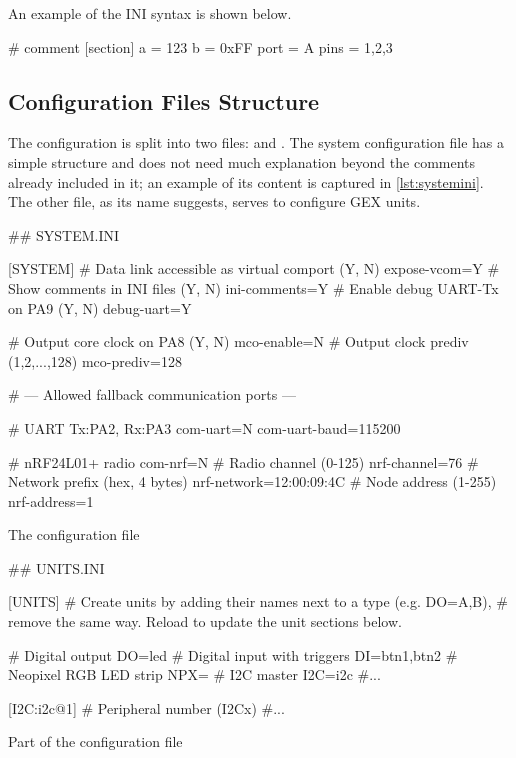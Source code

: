 \noindent
An example of the INI syntax is shown below.

\begin{inicode}
# comment
[section]
a = 123
b = 0xFF
port = A
pins = 1,2,3
\end{inicode}
	
\subsection{Configuration Files Structure}

The configuration is split into two files:  and . The system configuration file has a simple structure and does not need much explanation beyond the comments already included in it; an example of its content is captured in \cref{lst:systemini}. The other file, as its name suggests, serves to configure GEX units.

\begin{listing}
	\begin{inicode}
		## SYSTEM.INI
		
		[SYSTEM]
		# Data link accessible as virtual comport (Y, N)
		expose-vcom=Y
		# Show comments in INI files (Y, N)
		ini-comments=Y
		# Enable debug UART-Tx on PA9 (Y, N)
		debug-uart=Y
		
		# Output core clock on PA8 (Y, N)
		mco-enable=N
		# Output clock prediv (1,2,...,128)
		mco-prediv=128
		
		# --- Allowed fallback communication ports ---
		
		# UART Tx:PA2, Rx:PA3
		com-uart=N
		com-uart-baud=115200
		
		# nRF24L01+ radio
		com-nrf=N
		# Radio channel (0-125)
		nrf-channel=76
		# Network prefix (hex, 4 bytes)
		nrf-network=12:00:09:4C
		# Node address (1-255)
		nrf-address=1
	\end{inicode}
	\caption{\label{lst:systemini}The  configuration file}
\end{listing}

\begin{listing}
	\begin{inicode}
		## UNITS.INI
		
		[UNITS]
		# Create units by adding their names next to a type (e.g. DO=A,B),
		# remove the same way. Reload to update the unit sections below.
		
		# Digital output
		DO=led
		# Digital input with triggers
		DI=btn1,btn2
		# Neopixel RGB LED strip
		NPX=
		# I2C master
		I2C=i2c
		#...
		
		[I2C:i2c@1]
		# Peripheral number (I2Cx)
		#...
	\end{inicode}
	\caption{\label{lst:unitsini}Part of the  configuration file}
\end{listing}

